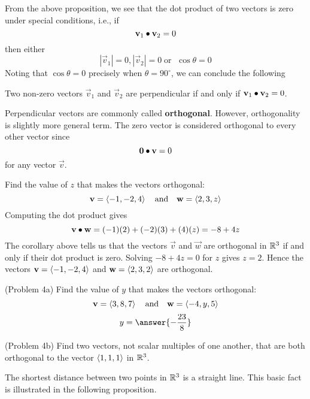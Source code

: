 \documentclass[handout]{ximera}
\begin{document}
From the above proposition, we see that the dot product of two vectors is zero under special conditions, i.e.,  if 
\[
\mathbf{v}_1 \bullet \mathbf{v}_2 = 0
\]
then either
\[
|\vec{v}_1| = 0, |\vec{v}_2| = 0 \; \text{or } \; \cos \theta = 0
\]
Noting that $\cos \theta = 0$ precisely when $\theta = 90^\circ$, we can conclude the following
\begin{corollary} 
Two non-zero vectors $\vec{v}_1$ and $\vec{v}_2$ are perpendicular if and only if $\mathbf{v}_1 \bullet \mathbf{v}_2 = 0$.
\end{corollary}
Perpendicular vectors are commonly called \textbf{orthogonal}. However, orthogonality is slightly more general term. 
The zero vector is considered orthogonal to every other vector since
\[
\mathbf 0 \bullet \mathbf v = 0
\]
for any vector $\vec v$.

\begin{example}[Example 4]
Find the value of $z$ that makes the vectors orthogonal:
\[
\mathbf v = \left\langle -1,-2, 4\right\rangle \quad \text{and} \quad \mathbf w = \left\langle 2,3, z\right\rangle
\]
Computing the dot product gives
\[
\mathbf v \bullet \mathbf w = (-1)(2) + (-2)(3) + (4)(z) = -8+4z
\]
The corollary above tells us that the vectors $\vec v$ and $\vec w$ are orthogonal in $\mathbb R^3$ if and only if their 
dot product is zero. Solving $-8 + 4z = 0$ for $z$
gives $z = 2$. Hence the vectors $\mathbf v = \left\langle -1,-2, 4\right\rangle$ and $\mathbf w = \left\langle 2,3, 2\right\rangle$ are orthogonal.
\end{example}

\begin{problem}(Problem 4a) 
Find the value of $y$ that makes the vectors orthogonal:
\[
\mathbf v = \left\langle 3,8, 7\right\rangle \quad \text{and} \quad \mathbf w = \left\langle -4,y, 5\right\rangle
\]
\[
y = \answer{-\frac{23}{8}}
\]
\end{problem}

\begin{problem}(Problem 4b) Find two vectors, not scalar multiples of one another, that are both orthogonal to the 
vector $\left\langle 1,1,1\right\rangle$ in $\mathbb R^3$.
\end{problem}


The shortest distance between two points in $\mathbb R^3$ is a straight line.  This basic fact is illustrated in the following proposition.
\end{document}
